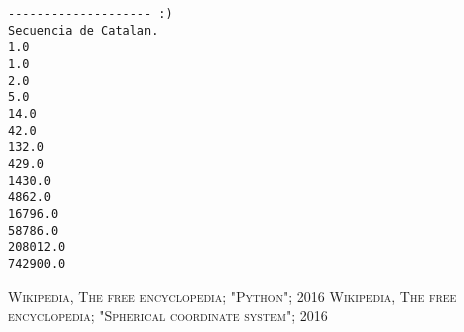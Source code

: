 \documentclass[12pt]{article}
\begin{document}
\begin{verbatim}
-------------------- :)
Secuencia de Catalan.
1.0
1.0
2.0
5.0
14.0
42.0
132.0
429.0
1430.0
4862.0
16796.0
58786.0
208012.0
742900.0
\end{verbatim}
\pagebreak

\begin{thebibliography}{X}
  \textsc{Wikipedia, The free encyclopedia; "Python"; 2016}
  \textsc{Wikipedia, The free encyclopedia; "Spherical coordinate system"; 2016}
 
\end{thebibliography}
\end{document}
